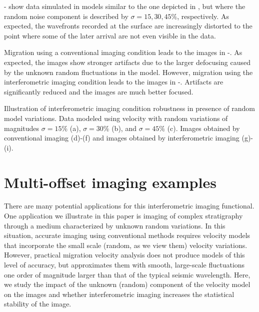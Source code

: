 - show data simulated in models
similar to the one depicted in , but where the random
noise component is described by $\sigma=15,30,45\%$, respectively. As
expected, the wavefronts recorded at the surface are increasingly
distorted to the point where some of the later arrival are not even
visible in the data.

Migration using a conventional imaging condition leads to the images in
-.  As expected, the
images show stronger artifacts due to the larger defocusing caused by
the unknown random fluctuations in the model.  However, migration
using the interferometric imaging condition leads to the images in
-.  Artifacts are
significantly reduced and the images are much better focused.

{Illustration of interferometric imaging condition robustness in
presence of random model variations. Data modeled using velocity with
random variations of magnitudes $\sigma=15\%$ (a), $\sigma=30\%$ (b),
and $\sigma=45\%$ (c). Images obtained by conventional imaging (d)-(f)
and images obtained by interferometric imaging (g)-(i).}


\section{Multi-offset imaging examples}
There are many potential applications for this interferometric imaging
functional. One application we illustrate in this paper is imaging of
complex stratigraphy through a medium characterized by unknown random
variations. In this situation, accurate imaging using conventional
methods requires velocity models that incorporate the small scale
(random, as we view them) velocity variations. However, practical
migration velocity analysis does not produce models of this level of
accuracy, but approximates them with smooth, large-scale fluctuations
one order of magnitude larger than that of the typical seismic
wavelength.  Here, we study the impact of the unknown (random)
component of the velocity model on the images and whether
interferometric imaging increases the statistical stability of the
image.

